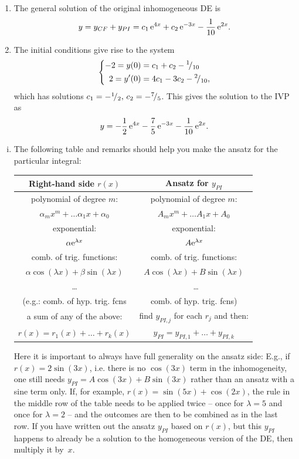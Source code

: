 \begin{example}
\begin{enumerate}[(1)]
	\item The general solution of the original inhomogeneous DE is
			\[ y = y_{CF} + y_{PI} = c_1\,\mathrm{e}^{4x}+c_2\,\mathrm{e}^{-3x} - \frac{1}{10}\,\mathrm{e}^{2x}. \]
	\item The initial conditions give rise to the system 
	\[ \left\{ \begin{split}
		-2 = y(0) & = c_1+c_2-{}^{1}\!/_{10} \\
		2 = y'(0) & = 4c_1-3c_2-{}^{2}\!/_{10},
	\end{split} \right. \]
	which has solutions $c_1=-{}^{1}\!/_{2},\,c_2=-{}^{7}\!/_{5}$. This gives the solution to the IVP as
	\[ y = -\frac12\,\mathrm{e}^{4x}-\frac{7}{5}\,\mathrm{e}^{-3x} - \frac{1}{10}\,\mathrm{e}^{2x}. \]
\end{enumerate}
\end{example}

\begin{remark}
\label{rem:inhomog}
\begin{enumerate}[(i)]
	\item The following table and remarks should help you make the ansatz for the particular integral:
	\begin{center}
		\begin{tabular}{ | c | c | }
			Right-hand side $r(x)$ & Ansatz for $y_{PI}$ \\ \hline \hline
			polynomial of degree $m$: & polynomial of degree $m$: \\ 
			$\alpha_m x^m + \dots \alpha_1 x + \alpha_0$ 
			& $A_m x^m + \dots A_1 x + A_0$ \\ \hline
			exponential: & exponential: \\ 
			$\alpha\mathrm{e}^{\lambda x}$ & $A\mathrm{e}^{\lambda x}$ \\ \hline
			comb. of trig. functions: & comb. of trig. functions: \\
			$\alpha \cos(\lambda x) + \beta \sin(\lambda x)$ &
			$A\cos(\lambda x) + B\sin(\lambda x)$ \\ \hline 
			\ldots & \ \ldots \\
			(e.g.: comb. of hyp. trig. fcns & comb. of hyp. trig. fcns) \\ \hline
			a sum of any of the above: & find $y_{PI,j}$ for each $r_j$ and then: \\
			$r(x) = r_1(x) + \dots + r_k(x)$ &
			$y_{PI} = y_{PI,1} + \dots + y_{PI,k}$  \\ \hline
		\end{tabular}
	\end{center}
	Here it is important to always have full generality on the ansatz side: E.g., if $r(x)=2\sin(3x)$, i.e. there is no $\cos(3x)$ term in the inhomogeneity, one still needs $y_{PI}=A\cos(3x) + B\sin(3x)$ rather than an ansatz with a sine term only. If, for example, $r(x)=\sin(5x)+\cos(2x)$, the rule in the middle row of the table needs to be applied twice -- once for $\lambda=5$ and once for $\lambda=2$ -- and the outcomes are then to be combined as in the last row. If you have written out the ansatz $y_{PI}$ based on $r(x)$, but this $y_{PI}$ happens to already be a solution to the homogeneous version of the DE, then multiply it by~$x$.

\end{enumerate}
\end{remark}
